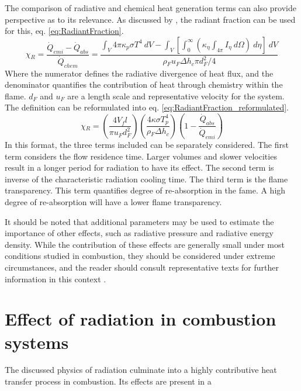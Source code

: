 The comparison of radiative and chemical heat generation terms can also provide perspective as to its relevance. As discussed by \citet{Liu2020TheFlames}, the radiant fraction can be used for this, eq. \ref{eq:RadiantFraction}.
\begin{equation}
    \chi{}_R=\frac{\dot{Q}_{emi}-\dot{Q}_{abs}}{\dot{Q}_{chem}}=\frac{\int_V{4\pi{}\kappa{}_p\sigma{}T^4~dV}-\int_V\left[\int_0^\infty{\left(\kappa{}_\eta{}\int_{4\pi}I_\eta{}~d\Omega\right)~d\eta{}}\right]~dV}{\rho{}_Fu_F\Delta{h}_c\pi{}d_F^2/4}
    \label{eq:RadiantFraction}
\end{equation}
Where the numerator defines the radiative divergence of heat flux, and the denominator quantifies the contribution of heat through chemistry within the flame. $d_F$ and $u_F$ are a length scale and representative velocity for the system.
The definition can be reformulated into eq. \ref{eq:RadiantFraction_reformulated}.
\begin{equation}
    \chi{}_R=\left(\frac{4V_fl}{\pi{}u_Fd_F^2}\right)\left(\frac{4\kappa{}\sigma{}T_p^4}{\rho{}_F\Delta{h}_c}\right)\left(1-\frac{\dot{Q}_{abs}}{\dot{Q}_{emi}}\right)
    \label{eq:RadiantFraction_reformulated}
\end{equation}
In this format, the three terms included can be separately considered. The first term considers the flow residence time. Larger volumes and slower velocities result in a longer period for radiation to have its effect.
The second term is inverse of the characteristic radiation cooling time. 
The third term is the flame transparency. This term quantifies degree of re-absorption in the fame. A high degree of re-absorption will have a lower flame transparency. 

It should be noted that additional parameters may be used to estimate the importance of other effects, such as radiative pressure and radiative energy density.
While the contribution of these effects are generally small under most conditions studied in combustion, they should be considered under extreme circumstances, and the reader should consult representative texts for further information in this context \cite{Pai1966RadiationDynamics}.


\section{Effect of radiation in combustion systems}
The discussed physics of radiation culminate into a highly contributive heat transfer process in combustion.
Its effects are present in a 

